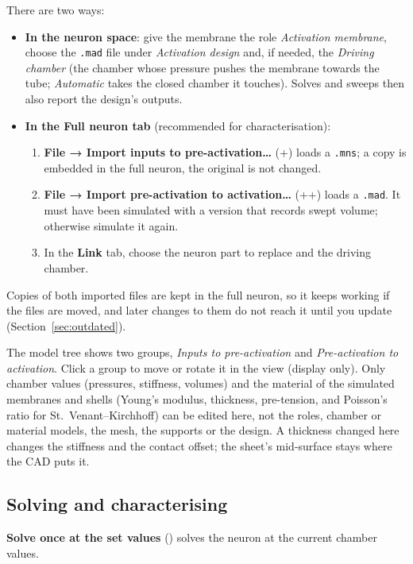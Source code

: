 \documentclass[11pt,a4paper]{article}
\newcommand{\code}[1]{\texttt{#1}}
\newcommand{\menu}[1]{\textsf{\textbf{#1}}}
\newcommand{\key}[1]{\fbox{\footnotesize\textsf{#1}}}
\begin{document}
There are two ways:
\begin{itemize}
\item \textbf{In the neuron space}: give the membrane the role \emph{Activation membrane}, choose the \code{.mad} file
  under \emph{Activation design} and, if needed, the \emph{Driving chamber} (the chamber whose pressure pushes the
  membrane towards the tube; \emph{Automatic} takes the closed chamber it touches). Solves and sweeps then also report
  the design's outputs.
\item \textbf{In the Full neuron tab} (recommended for characterisation):
  \begin{enumerate}
  \item \menu{File → Import inputs to pre-activation…} (\key{Ctrl}+\key{I}) loads a \code{.mns}; a copy is embedded
    in the full neuron, the original is not changed.
  \item \menu{File → Import pre-activation to activation…} (\key{Ctrl}+\key{Shift}+\key{I}) loads a \code{.mad}. It
    must have been simulated with a version that records swept volume; otherwise simulate it again.
  \item In the \menu{Link} tab, choose the neuron part to replace and the driving chamber.
  \end{enumerate}
\end{itemize}

Copies of both imported files are kept in the full neuron, so it keeps working if the files are moved, and later
changes to them do not reach it until you update (Section~\ref{sec:outdated}).

The model tree shows two groups, \emph{Inputs to pre-activation} and \emph{Pre-activation to activation}. Click a
group to move or rotate it in the view (display only). Only chamber values (pressures, stiffness, volumes) and the
material of the simulated membranes and shells (Young's modulus, thickness, pre-tension, and Poisson's ratio for
St.\ Venant--Kirchhoff) can be edited here, not the roles, chamber or material models, the mesh, the supports or the
design. A thickness changed here changes the stiffness and the contact offset; the sheet's mid-surface stays where the
CAD puts it.

\subsection{Solving and characterising}

\menu{Solve once at the set values} (\key{F5}) solves the neuron at the current chamber values.
\end{document}
